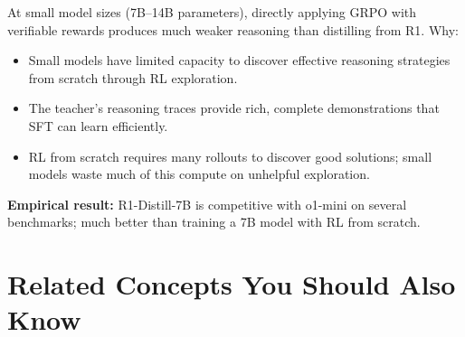 \documentclass[11pt, a4paper]{article}
\begin{document}
\begin{notebox}
At small model sizes (7B--14B parameters), directly applying GRPO with verifiable rewards produces much weaker reasoning than distilling from R1. Why:
\begin{itemize}[leftmargin=1.5em]
  \item Small models have limited capacity to discover effective reasoning strategies from scratch through RL exploration.
  \item The teacher's reasoning traces provide rich, complete demonstrations that SFT can learn efficiently.
  \item RL from scratch requires many rollouts to discover good solutions; small models waste much of this compute on unhelpful exploration.
\end{itemize}
\textbf{Empirical result:} R1-Distill-7B is competitive with o1-mini on several benchmarks; much better than training a 7B model with RL from scratch.
\end{notebox}

\newpage
\section{Related Concepts You Should Also Know}
\end{document}
